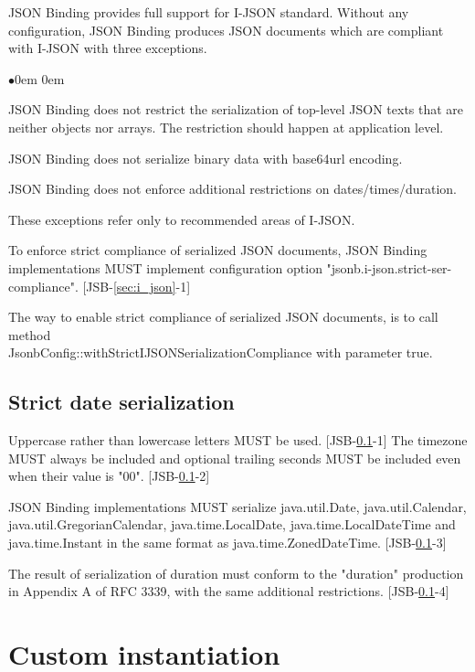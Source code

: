 JSON Binding provides full support for I-JSON standard. Without any configuration, JSON Binding produces JSON documents which are compliant with I-JSON with three exceptions.

\begin{list}{$\bullet$}{\parsep 0em  0em}
\item JSON Binding does not restrict the serialization of top-level JSON texts that are neither objects nor arrays. The restriction should happen at application level.
\item JSON Binding does not serialize binary data with base64url encoding.
\item JSON Binding does not enforce additional restrictions on dates/times/duration.
\end{list}

These exceptions refer only to recommended areas of I-JSON.

To enforce strict compliance of serialized JSON documents, JSON Binding implementations MUST implement configuration option "jsonb.i-json.strict-ser-compliance".
[JSB-\ref{sec:i_json}-1]

The way to enable strict compliance of serialized JSON documents, is to call method \\ JsonbConfig::withStrictIJSONSerializationCompliance with parameter true.

\subsection{Strict date serialization}
\label{subsec:strict_date_serialization}

Uppercase rather than lowercase letters MUST be used.  [JSB-\ref{subsec:strict_date_serialization}-1] The timezone MUST always be included and optional trailing seconds MUST be included even when their value is "00". [JSB-\ref{subsec:strict_date_serialization}-2]

JSON Binding implementations MUST serialize java.util.Date, java.util.Calendar, java.util.GregorianCalendar, java.time.LocalDate, java.time.LocalDateTime and java.time.Instant in the same format as java.time.ZonedDateTime. [JSB-\ref{subsec:strict_date_serialization}-3]

The result of serialization of duration must conform to the "duration" production in Appendix A of RFC 3339, with the same additional restrictions. [JSB-\ref{subsec:strict_date_serialization}-4]

\section{Custom instantiation}
\label{sec:custom_instantiation}

